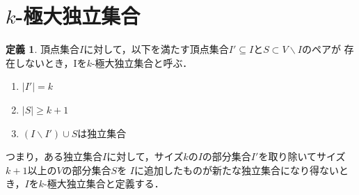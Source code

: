 \documentclass[12pt]{thesis}
\theoremstyle{definition}
\newtheorem{definition}{定義}[chapter]
\begin{document}
\section{$k$-極大独立集合}

\begin{definition}
頂点集合$I$に対して，以下を満たす頂点集合$I' \subseteq I$と$S\subset V \backslash I$のペアが
存在しないとき，Iを$k$-極大独立集合と呼ぶ．
\begin{enumerate}
\item $|I'| = k$
\item $|S| \geq k + 1$
\item $(I \backslash I') \cup S$は独立集合
\end{enumerate}
\end{definition}
つまり，ある独立集合$I$に対して，サイズ$k$の$I$の部分集合$I'$を取り除いてサイズ$k + 1$以上の$V$の部分集合$S$を
$I$に追加したものが新たな独立集合になり得ないとき，$I$を$k$-極大独立集合と定義する．


\newpage
\end{document}
